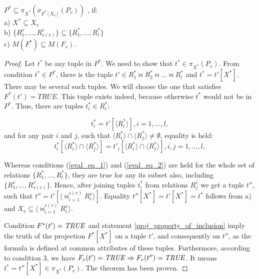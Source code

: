 \begin{theorem}
$P^{\ast} \subseteq \pi_{X^{\ast}} (\sigma_{F^{\ast}[X_v]} (P_{v}))$
, if:
\\a) $X^{\ast} \subseteq X_{v}$
\\b) 
$ \{R^{v}_{1}, \ldots, R^{v}_{s(v)}\}
\subseteq
\{R^{\ast}_{1}, \ldots, R^{\ast}_{l}\} $
\\c) $M (F^{\ast}) \subseteq M (F_{v}) $.
\label{th_base}
\end{theorem} 
\begin{proof}
Let $t^{\ast}$ be any tuple in $P^{\ast}$. We need to show that
$t^{\ast} \in \pi_{X^{\ast}} (P_{v})$. From condition  $t^{\ast} \in P^{\ast}$,
there is the tuple $t' \in R^{\ast}_1 \Join R^{\ast}_2\Join\ldots
\Join R^{\ast}_l$ and $t^{\ast} = t'[X^{\ast}]$. There may be several such tuples. We will choose the one that satisfies $F^{\ast}(t')=TRUE$.
This tuple exists indeed, because otherwise $t^{\ast}$ would not be in $P^{\ast}$. Thus, there are tuples
$t^{\ast}_i \in R^{\ast}_i$:

\begin{equation}
t^{\ast}_i = t'[\langle R^{\ast}_i\rangle], i = 1,\dots,l,
\label{eval_eq_1}
\end{equation}
\def \intersecij {\langle R^{\ast}_i \rangle \cap \langle R^{\ast}_j \rangle}
and for any pair $i$ and $j$, such that  $\intersecij \neq \emptyset$, equality is held:
\begin{equation}
t^{\ast}_i[\intersecij] = t'_i[\intersecij], i,j = 1,\dots,l,
\label{eval_eq_2}
\end{equation}

Whereas conditions (\ref{eval_eq_1}) and (\ref{eval_eq_2}) are held for the
whole set of relations $\{R^{\ast}_{1}, \ldots, R^{\ast}_{l}\}$, they are
true for any its subset also, including $\{R^{v}_{1}, \ldots, R^{v}_{s(v)}\}$.
Hence, after joining tuples $t^{\ast}_i$ from relations $R^{v}_j$ we get a tuple
$t''$, such that $t'' = t'[\langle {\Join}_{i=1}^{s(v)} R^v_i \rangle]$.
Equality $t''[X^{\ast}] = t'[X^{\ast}] = t^{\ast}$ follows from a) and $X_v
\subseteq \langle {\Join}_{i=1}^{s(v)} R^v_i \rangle$.

Condition  $F^{\ast}(t') = \mathit{TRUE}$ and statement 
\ref{proj_property_of_inclusion} imply the truth of the projection $F^{\ast}
[X^{\ast}]$ on a tuple $t'$, and consequently on $t''$, as the formula is defined at common attributes of these tuples. Furthermore, according to condition 3, we have $F_v (t') = \mathit{TRUE} \Rightarrow F_v (t'') = \mathit{TRUE}$.
It means $t^{\ast} = t''[X^{\ast}] \in \pi_{X^{\ast}} (P_{v})$.
The theorem has been proven.
\end{proof}
